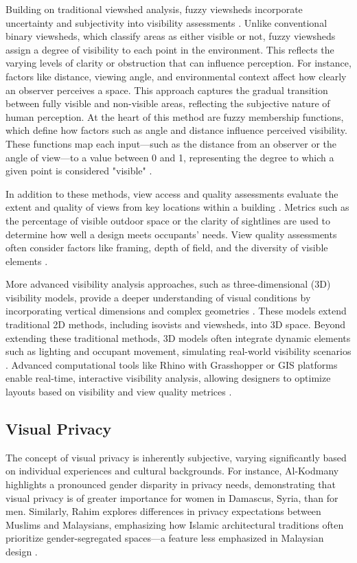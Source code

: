\documentclass[final,3p,times,review]{elsarticle}
\begin{document}
Building on traditional viewshed analysis, fuzzy viewsheds incorporate uncertainty and subjectivity into visibility assessments \cite{fisher1992, fisher1994, alberti2017, cimburova2022}. Unlike conventional binary viewsheds, which classify areas as either visible or not, fuzzy viewsheds assign a degree of visibility to each point in the environment. This reflects the varying levels of clarity or obstruction that can influence perception. For instance, factors like distance, viewing angle, and environmental context affect how clearly an observer perceives a space. This approach captures the gradual transition between fully visible and non-visible areas, reflecting the subjective nature of human perception. At the heart of this method are fuzzy membership functions, which define how factors such as angle and distance influence perceived visibility. These functions map each input---such as the distance from an observer or the angle of view---to a value between 0 and 1, representing the degree to which a given point is considered "visible" \cite{fisher2024}.


In addition to these methods, view access and quality assessments evaluate the extent and quality of views from key locations within a building \cite{biljecki2021}. Metrics such as the percentage of visible outdoor space or the clarity of sightlines are used to determine how well a design meets occupants' needs. View quality assessments often consider factors like framing, depth of field, and the diversity of visible elements \cite{kent2020,abdelrahman2023}.

More advanced visibility analysis approaches, such as three-dimensional (3D) visibility models, provide a deeper understanding of visual conditions by incorporating vertical dimensions and complex geometries \cite{morello2009, suleiman2013,chen2021,krukar2021, parent2023}. These models extend traditional 2D methods, including isovists and viewsheds, into 3D space. Beyond extending these traditional methods, 3D models often integrate dynamic elements such as lighting and occupant movement, simulating real-world visibility scenarios \cite{othman2019, snopkova2023}. Advanced computational tools like Rhino with Grasshopper or GIS platforms enable real-time, interactive visibility analysis, allowing designers to optimize layouts based on visibility and view quality metrices \cite{wu2023, khaleel2023, guo2023}.

\subsection{Visual Privacy}
The concept of visual privacy is inherently subjective, varying significantly based on individual experiences and cultural backgrounds. For instance, Al-Kodmany highlights a pronounced gender disparity in privacy needs, demonstrating that visual privacy is of greater importance for women in Damascus, Syria, than for men\cite{Kodmany1999}. Similarly, Rahim explores differences in privacy expectations between Muslims and Malaysians, emphasizing how Islamic architectural traditions often prioritize gender-segregated spaces—a feature less emphasized in Malaysian design \cite{rahim2015}. 
\end{document}
